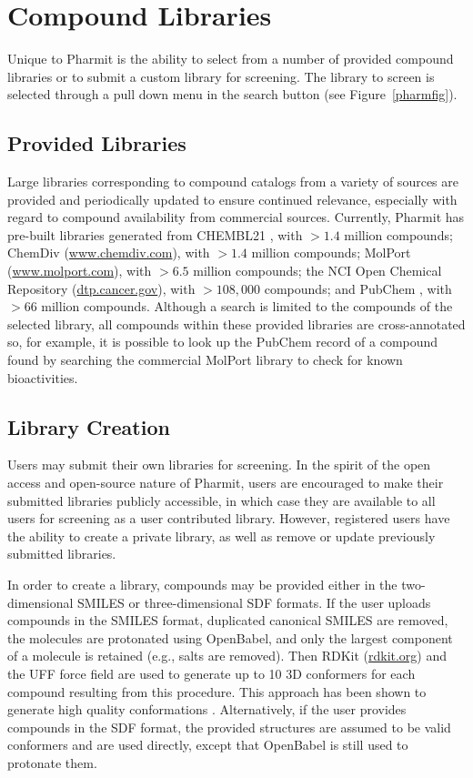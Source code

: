 \section{Compound Libraries}

Unique to Pharmit is the ability to select from a number of provided compound libraries or to submit a custom library for screening.  The library to screen is selected through a pull down menu in the search button (see Figure~\ref{pharmfig}).  

\subsection{Provided Libraries}

Large libraries corresponding to compound catalogs from a variety of sources are provided and periodically updated to ensure continued relevance, especially with regard to compound availability from commercial sources.  Currently, Pharmit has pre-built libraries generated from CHEMBL21 \cite{Gaulton_2011}, with $>1.4$ million compounds; ChemDiv (\url{www.chemdiv.com}), with $>1.4$ million compounds; MolPort (\url{www.molport.com}), with $>6.5$ million compounds; the NCI Open Chemical Repository (\url{dtp.cancer.gov}), with $>108,000$ compounds; and PubChem \cite{Kim_2015}, with $>66$ million compounds. 
 Although a search is limited to the compounds of the selected library, all compounds within these provided libraries are cross-annotated so, for example, it is possible to look up the PubChem record of a compound found by searching the commercial MolPort library to check for known bioactivities.


\subsection{Library Creation}

Users may submit their own libraries for screening.  In the spirit of the open access and open-source nature of Pharmit, users are encouraged to make their submitted libraries publicly accessible, in which case they are available to all users for screening as a user contributed library.  However, registered users have the ability to create a private library, as well as remove or update previously submitted libraries. 

In order to create a library, compounds may be provided either in the two-dimensional SMILES or three-dimensional SDF formats.  If the user uploads compounds in the SMILES format, duplicated canonical SMILES are removed, the molecules are protonated using OpenBabel, and only the largest component of a molecule is retained (e.g., salts are removed).  Then RDKit (\url{rdkit.org}) and the UFF force field \cite{Rappe_1992} are used to generate up to 10 3D conformers for each compound resulting from this procedure.  This approach has been shown to generate high quality conformations \cite{Ebejer_2012}.  Alternatively, if the user provides compounds in the SDF format, the provided structures are assumed to be valid conformers and are used directly, except that OpenBabel is still used to protonate them.
